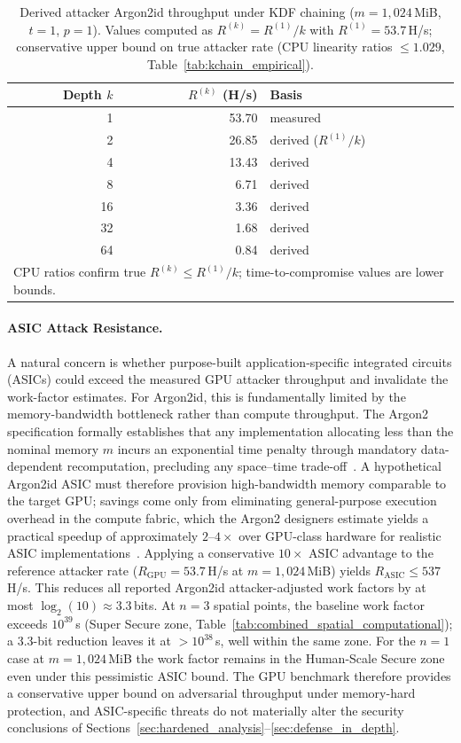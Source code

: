 \documentclass[journal,article,accept,pdftex,moreauthors]{Definitions/mdpi}
\begin{document}
\begin{table}[H]
\caption{Derived attacker Argon2id throughput under KDF chaining ($m=1{,}024$\,MiB, $t=1$, $p=1$). Values computed as $R^{(k)} = R^{(1)}/k$ with $R^{(1)}=53.7$\,H/s; conservative upper bound on true attacker rate (CPU linearity ratios $\leq 1.029$, Table~\ref{tab:kchain_empirical}).}
\label{tab:argon2_kchain_attacker}
\centering
\begin{tabular}{rrl}
\toprule
\textbf{Depth $k$} & \textbf{$R^{(k)}$ (H/s)} & \textbf{Basis} \\
\midrule
 1 & 53.70 & measured \\
 2 & 26.85 & derived ($R^{(1)}/k$) \\
 4 & 13.43 & derived \\
 8 &  6.71 & derived \\
16 &  3.36 & derived \\
32 &  1.68 & derived \\
64 &  0.84 & derived \\
\bottomrule
\multicolumn{3}{l}{\footnotesize CPU ratios confirm true $R^{(k)} \leq R^{(1)}/k$; time-to-compromise values are lower bounds.}
\end{tabular}
\end{table}


\paragraph{ASIC Attack Resistance.}
A natural concern is whether purpose-built application-specific integrated circuits (ASICs) could exceed the measured GPU attacker throughput and invalidate the work-factor estimates. For Argon2id, this is fundamentally limited by the memory-bandwidth bottleneck rather than compute throughput. The Argon2 specification formally establishes that any implementation allocating less than the nominal memory $m$ incurs an exponential time penalty through mandatory data-dependent recomputation, precluding any space--time trade-off~\cite{7467361}. A hypothetical Argon2id ASIC must therefore provision high-bandwidth memory comparable to the target GPU; savings come only from eliminating general-purpose execution overhead in the compute fabric, which the Argon2 designers estimate yields a practical speedup of approximately $2$--$4\times$ over GPU-class hardware for realistic ASIC implementations~\cite{7467361,Wetzels2016}. Applying a conservative $10\times$ ASIC advantage to the reference attacker rate ($R_{\text{GPU}} = 53.7$\,H/s at $m=1{,}024$\,MiB) yields $R_{\text{ASIC}} \leq 537$\,H/s. This reduces all reported Argon2id attacker-adjusted work factors by at most $\log_2(10) \approx 3.3$\,bits. At $n=3$ spatial points, the baseline work factor exceeds $10^{39}$\,s (Super Secure zone, Table~\ref{tab:combined_spatial_computational}); a 3.3-bit reduction leaves it at $>10^{38}$\,s, well within the same zone. For the $n=1$ case at $m=1{,}024$\,MiB the work factor remains in the Human-Scale Secure zone even under this pessimistic ASIC bound. The GPU benchmark therefore provides a conservative upper bound on adversarial throughput under memory-hard protection, and ASIC-specific threats do not materially alter the security conclusions of Sections~\ref{sec:hardened_analysis}--\ref{sec:defense_in_depth}.
\end{document}
